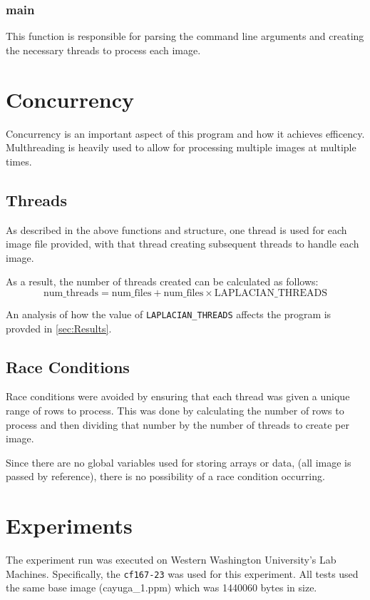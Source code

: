 \documentclass{article}
\begin{document}
\subsubsection{main}
This function is responsible for parsing the command line arguments and
creating the necessary threads to process each image.

\section{Concurrency}
Concurrency is an important aspect of this program and how it achieves
efficency. Multhreading is heavily used to allow for processing multiple images
at multiple times.

\subsection{Threads}
As described in the above functions and structure, one thread is used for each
image file provided, with that thread creating subsequent threads to handle each
image.

As a result, the number of threads created can be calculated as follows:
\begin{equation*}
    \text{num\_threads} = \text{num\_files} + \text{num\_files} \times \text{LAPLACIAN\_THREADS}
\end{equation*}

An analysis of how the value of \texttt{LAPLACIAN\_THREADS} affects the program
is provded in \autoref{sec:Results}.

\subsection{Race Conditions}
Race conditions were avoided by ensuring that each thread was given a unique
range of rows to process. This was done by calculating the number of rows
to process and then dividing that number by the number of threads to create
per image.

Since there are no global variables used for storing arrays or data, (all
image is passed by reference), there is no possibility of a race condition
occurring.

\section{Experiments}
The experiment run was executed on Western Washington University's Lab Machines. Specifically,
the \texttt{cf167-23} was used for this experiment. All tests used the same base image (cayuga\_1.ppm)
which was 1440060 bytes in size.
\end{document}
